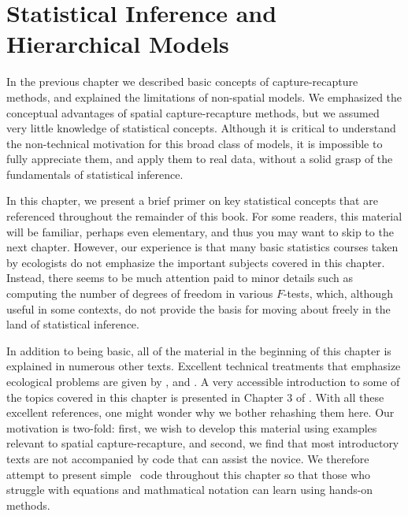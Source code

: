 \chapter{
Statistical Inference and Hierarchical Models
}
\label{chapt.modeling}


\vspace{.3in}

In the previous chapter we described basic concepts of
capture-recapture methods, and explained the limitations of
non-spatial models. We emphasized the conceptual advantages of
spatial capture-recapture methods, but we assumed very little
knowledge of statistical concepts. Although it is critical to understand the
non-technical motivation for this broad class of models, it is
impossible to fully appreciate them, and apply them to real data,
without a solid grasp of the fundamentals of statistical
inference.

In this chapter, we present a brief primer on key
statistical concepts that are referenced throughout the remainder of
this book. For some readers, this material will be familiar,
perhaps even elementary, and thus you may want to skip to the next
chapter. However, our experience is that many basic statistics courses
taken by ecologists do not emphasize the important subjects covered in
this chapter. Instead, there seems to be much attention paid to
minor details such as computing the number of degrees of freedom in
various $F$-tests, which, although useful in some contexts, do not
provide the basis for moving about freely in the land of statistical
inference.

In addition to being basic, all of the material in the
beginning of this chapter is explained in numerous other
texts. Excellent technical treatments that emphasize ecological
problems are given by
\citet{williams_etal:2002}, \citet{royle_dorazio:2008} and
\citet{link_barker:2010}. A very accessible introduction to some of the
topics covered in this chapter is presented in Chapter 3 of
\citet{mackenzie_etal:2006}. With all these excellent references, one
might wonder why we bother rehashing them here. Our motivation is
two-fold: first, we wish to develop this material using examples
relevant to spatial capture-recapture, and second, we find that most
introductory texts are not accompanied by code that can
assist the novice. We therefore attempt to present simple \R~code
throughout this chapter so that those who struggle with equations and
mathmatical notation can learn using hands-on methods.


